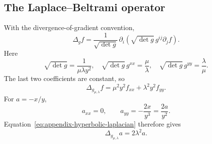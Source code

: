 \subsection{The Laplace--Beltrami operator}

With the divergence-of-gradient convention,
\[
 \Delta_g f
 =\frac1{\sqrt{\det g}}\,
  \partial_i\!\left(\sqrt{\det g}\,g^{ij}\partial_jf\right).
\]
Here
\[
 \sqrt{\det g}=\frac1{\mu\lambda y^2},
 \quad
 \sqrt{\det g}\,g^{xx}=\frac{\mu}{\lambda},
 \quad
 \sqrt{\det g}\,g^{yy}=\frac{\lambda}{\mu}.
\]
The last two coefficients are constant, so
\begin{equation}\label{eq:appendix-hyperbolic-laplacian}
 \Delta_{g_{\mu,\lambda}}f
 =\mu^2y^2f_{xx}+\lambda^2y^2f_{yy}.
\end{equation}
For \(a=-x/y\),
\[
 a_{xx}=0,
 \qquad
 a_{yy}=-\frac{2x}{y^3}=\frac{2a}{y^2}.
\]
Equation~\eqref{eq:appendix-hyperbolic-laplacian} therefore gives
\[
 \Delta_{g_{\mu,\lambda}}a=2\lambda^2a.
\]
